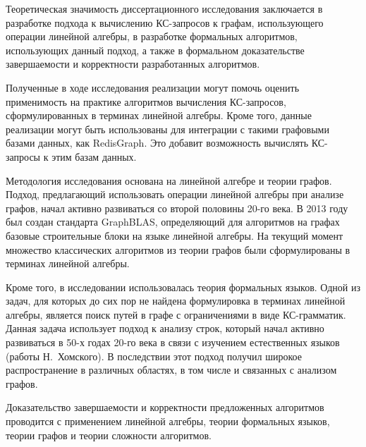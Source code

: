 {\influence} 
Теоретическая значимость диссертационного исследования заключается в разработке подхода к вычислению КС-запросов к графам, использующего операции линейной алгебры, в разработке формальных алгоритмов, использующих данный подход, а также в формальном доказательстве завершаемости и корректности разработанных алгоритмов.

Полученные в ходе исследования реализации могут помочь оценить применимость на практике алгоритмов вычисления КС-запросов, сформулированных в терминах линейной алгебры. Кроме того, данные реализации могут быть использованы для интеграции с такими графовыми базами данных, как RedisGraph. Это добавит возможность вычислять КС-запросы к этим базам данных.

{\methods} Методология исследования основана на линейной алгебре и теории графов. Подход, предлагающий использовать операции линейной алгебры при анализе графов, начал активно развиваться со второй половины 20-го века. В 2013 году был создан стандарта GraphBLAS, определяющий для алгоритмов на графах базовые строительные блоки на языке линейной алгебры. На текущий момент множество классических алгоритмов из теории графов были сформулированы в терминах линейной алгебры.

Кроме того, в исследовании использовалась теория формальных языков. Одной из задач, для которых до сих пор не найдена формулировка в терминах линейной алгебры, является поиск путей в графе с ограничениями в виде КС-грамматик. Данная задача использует подход к анализу строк, который начал активно развиваться в 50-х годах 20-го века в связи с изучением естественных языков (работы Н.~Хомского). В последствии этот подход получил широкое распространение в различных областях, в том числе и связанных с анализом графов.

Доказательство завершаемости и корректности предложенных алгоритмов проводится с применением линейной алгебры, теории формальных языков, теории графов и теории сложности алгоритмов.

